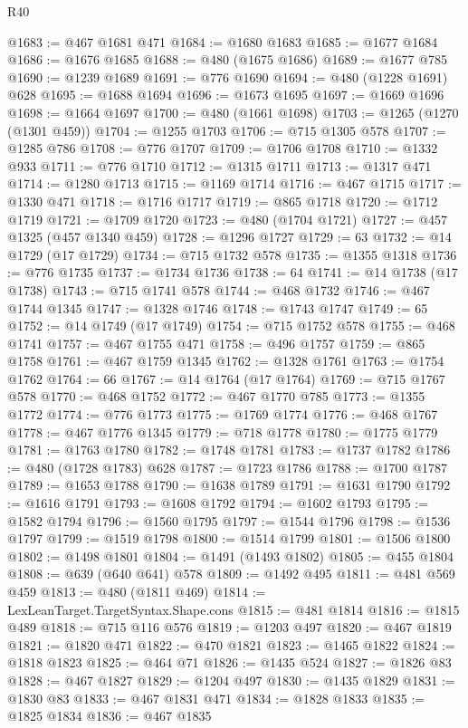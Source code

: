 \begin{lexlean}{R40}
\begin{coremodule}
@1683 := @467 @1681 @471
@1684 := @1680 @1683
@1685 := @1677 @1684
@1686 := @1676 @1685
@1688 := @480 (@1675 @1686)
@1689 := @1677 @785
@1690 := @1239 @1689
@1691 := @776 @1690
@1694 := @480 (@1228 @1691) @628
@1695 := @1688 @1694
@1696 := @1673 @1695
@1697 := @1669 @1696
@1698 := @1664 @1697
@1700 := @480 (@1661 @1698)
@1703 := @1265 (@1270 (@1301 @459))
@1704 := @1255 @1703
@1706 := @715 @1305 @578
@1707 := @1285 @786
@1708 := @776 @1707
@1709 := @1706 @1708
@1710 := @1332 @933
@1711 := @776 @1710
@1712 := @1315 @1711
@1713 := @1317 @471
@1714 := @1280 @1713
@1715 := @1169 @1714
@1716 := @467 @1715
@1717 := @1330 @471
@1718 := @1716 @1717
@1719 := @865 @1718
@1720 := @1712 @1719
@1721 := @1709 @1720
@1723 := @480 (@1704 @1721)
@1727 := @457 @1325 (@457 @1340 @459)
@1728 := @1296 @1727
@1729 := 63
@1732 := @14 @1729 (@17 @1729)
@1734 := @715 @1732 @578
@1735 := @1355 @1318
@1736 := @776 @1735
@1737 := @1734 @1736
@1738 := 64
@1741 := @14 @1738 (@17 @1738)
@1743 := @715 @1741 @578
@1744 := @468 @1732
@1746 := @467 @1744 @1345
@1747 := @1328 @1746
@1748 := @1743 @1747
@1749 := 65
@1752 := @14 @1749 (@17 @1749)
@1754 := @715 @1752 @578
@1755 := @468 @1741
@1757 := @467 @1755 @471
@1758 := @496 @1757
@1759 := @865 @1758
@1761 := @467 @1759 @1345
@1762 := @1328 @1761
@1763 := @1754 @1762
@1764 := 66
@1767 := @14 @1764 (@17 @1764)
@1769 := @715 @1767 @578
@1770 := @468 @1752
@1772 := @467 @1770 @785
@1773 := @1355 @1772
@1774 := @776 @1773
@1775 := @1769 @1774
@1776 := @468 @1767
@1778 := @467 @1776 @1345
@1779 := @718 @1778
@1780 := @1775 @1779
@1781 := @1763 @1780
@1782 := @1748 @1781
@1783 := @1737 @1782
@1786 := @480 (@1728 @1783) @628
@1787 := @1723 @1786
@1788 := @1700 @1787
@1789 := @1653 @1788
@1790 := @1638 @1789
@1791 := @1631 @1790
@1792 := @1616 @1791
@1793 := @1608 @1792
@1794 := @1602 @1793
@1795 := @1582 @1794
@1796 := @1560 @1795
@1797 := @1544 @1796
@1798 := @1536 @1797
@1799 := @1519 @1798
@1800 := @1514 @1799
@1801 := @1506 @1800
@1802 := @1498 @1801
@1804 := @1491 (@1493 @1802)
@1805 := @455 @1804
@1808 := @639 (@640 @641) @578
@1809 := @1492 @495
@1811 := @481 @569 @459
@1813 := @480 (@1811 @469)
@1814 := LexLeanTarget.TargetSyntax.Shape.cons
@1815 := @481 @1814
@1816 := @1815 @489
@1818 := @715 @116 @576
@1819 := @1203 @497
@1820 := @467 @1819
@1821 := @1820 @471
@1822 := @470 @1821
@1823 := @1465 @1822
@1824 := @1818 @1823
@1825 := @464 @71
@1826 := @1435 @524
@1827 := @1826 @83
@1828 := @467 @1827
@1829 := @1204 @497
@1830 := @1435 @1829
@1831 := @1830 @83
@1833 := @467 @1831 @471
@1834 := @1828 @1833
@1835 := @1825 @1834
@1836 := @467 @1835

\end{coremodule}
\end{lexlean}
